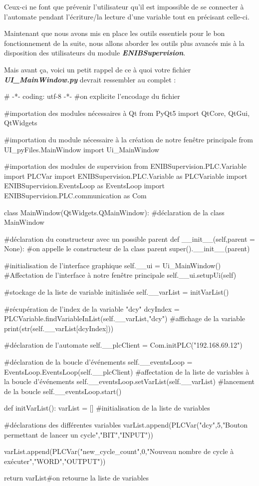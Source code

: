 \documentclass[12pt]{report}    %
\newcommand{\ib}[1]{{\bfseries\itshape #1}}
\newcommand{\smallSkip}{\vskip 0.5cm}
\begin{document}
Ceux-ci ne font que prévenir l'utilisateur qu'il est impossible de se connecter à l'automate pendant l'écriture/la lecture d'une variable tout en précisant celle-ci.
\smallSkip

Maintenant que nous avons mis en place les outils essentiels pour le bon fonctionnement de la suite, nous allons aborder les outils plus avancés mis à la disposition des utilisateurs du module \ib{ENIBSupervision}.\smallSkip

Mais avant ça, voici un petit rappel de ce à quoi votre fichier \ib{UI\_MainWindow.py} devrait ressembler au complet : %
\begin{pyCode}
# -*- coding: utf-8 -*-
#on explicite l’encodage du fichier

#importation des modules nécessaires à Qt
from PyQt5 import QtCore, QtGui, QtWidgets

#importation du module nécessaire à la création de notre fenêtre principale
from UI_pyFiles.MainWindow import Ui_MainWindow

#importation des modules de supervision
from ENIBSupervision.PLC.Variable import PLCVar
import ENIBSupervision.PLC.Variable as PLCVariable
import ENIBSupervision.EventsLoop as EventsLoop
import ENIBSupervision.PLC.communication as Com

class MainWindow(QtWidgets.QMainWindow): #déclaration de la class MainWindow

	#déclaration du constructeur avec un possible parent
	def __init__(self,parent = None):
		#on appelle le constructeur de la class parent
		super().__init__(parent)

		#initialisation de l'interface graphique
		self.__ui = Ui_MainWindow()
		#Affectation de l'interface à notre fenêtre principale
		self.__ui.setupUi(self)

		#stockage de la liste de variable initialisée
		self.__varList = initVarList()

		#récupération de l'index de la variable "dcy"
		dcyIndex = PLCVariable.findVariableInList(self.__varList,"dcy")
		#affichage de la variable
		print(str(self.__varList[dcyIndex]))

		#déclaration de l'automate
		self.__plcClient = Com.initPLC("192.168.69.12")
		

		#déclaration de la boucle d'événements
		self.__eventsLoop = EventsLoop.EventsLoop(self.__plcClient)
		#affectation de la liste de variables à la boucle d'événements
		self.__eventsLoop.setVarList(self.__varList)
		#lancement de la boucle
		self.__eventsLoop.start()



def initVarList():
	varList = [] #initialisation de la liste de variables

	#déclarations des différentes variables
	varList.append(PLCVar("dcy",5,"Bouton permettant de lancer un cycle","BIT","INPUT"))

	varList.append(PLCVar("new_cycle_count",0,"Nouveau nombre de cycle à exécuter","WORD","OUTPUT"))

	return varList#on retourne la liste de variables
\end{pyCode}
\end{document}

